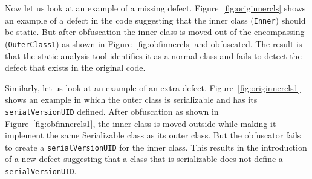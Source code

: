 \documentclass[conference]{IEEEtran}
\begin{document}
% 	
%  
% 
% 

Now let us look at an example of a missing defect. Figure~\ref{fig:originnercls} shows an example of a defect in the code suggesting that the inner 
class ({\tt Inner}) should be static. But after obfuscation the inner class is moved out of the encompassing ({\tt OuterClass1}) as shown in 
Figure~\ref{fig:obfinnercls} and obfuscated. The result is that the static analysis tool identifies it as a normal class and fails to detect the 
defect that exists in the original code.

Similarly, let us look at an example of an extra defect. Figure~\ref{fig:originnercls1} shows an example in which the outer class is serializable
and has its {\tt serialVersionUID} defined. After obfuscation as shown in Figure~\ref{fig:obfinnercls1}, the inner class is moved outside while making it 
implement the same Serializable class as its outer class. But the obfuscator fails to create a {\tt serialVersionUID} for the inner class. This results in the
introduction of a new defect suggesting that a class that is serializable does not define a {\tt serialVersionUID}.
\end{document}
